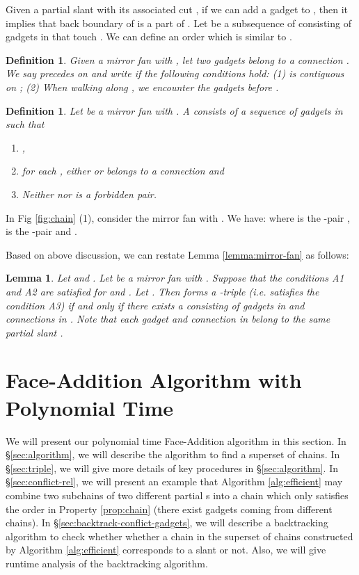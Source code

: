 \documentclass[11pt]{article}
\newtheorem{definition}[figure]{Definition}
\newtheorem{lemma}[figure]{Lemma}
\begin{document}
Given a partial slant   with its associated cut ,
if we can add a gadget  to ,
then it implies that back boundary  of  is a part of .
Let  be a subsequence of 
consisting of gadgets in  that touch .
We can define an order  which is similar to .


\begin{definition}\label{def:lessthan-L}
Given a mirror fan  with ,
let two gadgets  belong to a connection .
We say  { \em precedes}  on  and write
 if the following conditions hold:
(1)  is contiguous on ;
(2) When walking along , we encounter the gadgets 
before .
\end{definition}


\begin{definition}\label{def:backbone}
Let  be a mirror fan with . A 
consists of a sequence of gadgets 
in  such that
\begin{enumerate}
\item ,

\item for each ,
either  or  belongs to
a connection  and

\item Neither  nor  is a forbidden pair.
\end{enumerate}
\end{definition}

In Fig \ref{fig:chain} (1), consider the mirror fan  with .
We have: 
 where  is the
-pair ,
 is the -pair  and
.


Based on above discussion, we can restate Lemma \ref{lemma:mirror-fan}
as follows:

\begin{lemma}\label{lemma:valid-mirror-fan}
Let  and . Let  be a mirror fan with
. Suppose that the conditions A1 and A2 are satisfied for
 and . Let .
Then  forms a -triple (i.e.  satisfies the
condition A3) if and only if there exists a 
consisting of gadgets in  and connections in .
Note that each gadget and connection in 
belong to the same partial slant  .
\end{lemma}




\section{Face-Addition Algorithm with Polynomial Time}\label{sec:impl}

We will present our polynomial time Face-Addition algorithm in this section.
In \S \ref{sec:algorithm},
we will describe the algorithm to find a superset of chains.
In \S \ref{sec:triple},
we will give more details of key procedures in \S \ref{sec:algorithm}.
In \S \ref{sec:conflict-rel},
we will present an example that Algorithm \ref{alg:efficient} may
combine two subchains of two different partial s into a chain which only
satisfies the order  in Property \ref{prop:chain}
(there exist gadgets coming from different chains).
In \S \ref{sec:backtrack-conflict-gadgets},
we will describe a backtracking algorithm to check
whether whether a chain in the superset of chains constructed
by Algorithm \ref{alg:efficient} corresponds
to a slant  or not.
Also, we will give runtime analysis of the backtracking algorithm.
\end{document}
